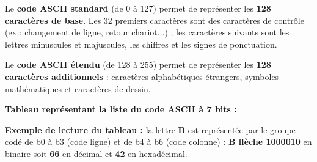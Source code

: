 \documentclass{article}
\begin{document}
Le \textbf{code ASCII standard} (de 0 à 127) permet de représenter les \textbf{128 caractères de base}. 
Les 32 premiers caractères sont des caractères de contrôle (ex : changement de ligne, retour chariot...) ;
les caractères suivants sont les lettres minuscules et majuscules, les chiffres et les signes de ponctuation.

Le \textbf{code ASCII étendu} (de 128 à 255) permet de représenter les \textbf{128 caractères additionnels} : caractères alphabétiques
étrangers, symboles mathématiques et caractères de dessin.

\textbf{Tableau représentant la liste du code ASCII à 7 bits :}

\textbf{Exemple de lecture du tableau :} la lettre \textbf{B} est représentée par le groupe codé de b0 à b3 (code ligne) et de b4 à b6
(code colonne) : \textbf{B flèche 1000010} en binaire soit \textbf{66} en décimal et \textbf{42} en hexadécimal.
\end{document}
